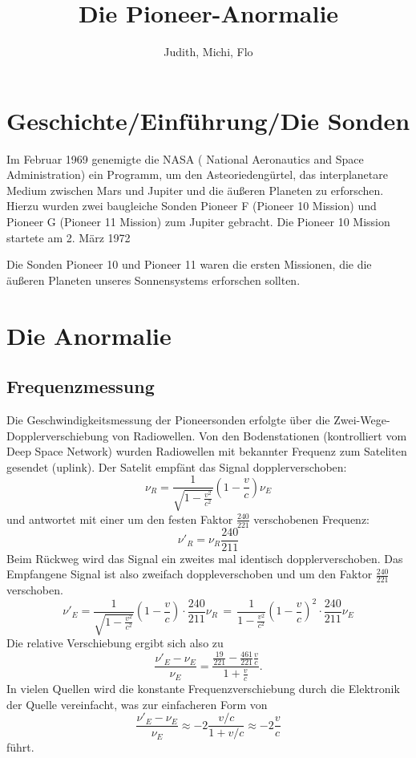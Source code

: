 \documentclass[a4paper,10pt]{article}
\title{Die Pioneer-Anormalie}
\author{Judith, Michi, Flo}
\begin{document}
\maketitle

% 

\section{Geschichte/Einführung/Die Sonden}
Im Februar 1969 genemigte die NASA ( National Aeronautics and Space Administration) ein Programm, um den Asteoriedengürtel,
das interplanetare Medium zwischen Mars und Jupiter und die äußeren Planeten zu erforschen.
Hierzu wurden zwei baugleiche Sonden Pioneer F (Pioneer 10 Mission) und Pioneer G (Pioneer 11 Mission) zum Jupiter gebracht.
Die Pioneer 10 Mission startete am 2. März 1972

Die Sonden Pioneer 10 und Pioneer 11 waren die ersten Missionen, die die äußeren Planeten unseres Sonnensystems erforschen sollten. 


\section{Die Anormalie}
\subsection{Frequenzmessung}

Die Geschwindigkeitsmessung der Pioneersonden erfolgte über die Zwei-Wege-Dopplerverschiebung von Radiowellen.
Von den Bodenstationen (kontrolliert vom Deep Space Network) wurden Radiowellen mit bekannter Frequenz zum Sateliten gesendet (uplink).
Der Satelit empfänt das Signal dopplerverschoben:
\begin{equation}
 \nu_R = \frac{1}{\sqrt{1-\frac{v^2}{c^2}}}(1-\frac{v}{c})\nu_E
\end{equation}
und antwortet mit einer um den festen Faktor $ \frac{240}{221} $ verschobenen Frequenz:
\begin{equation}
\nu'_R = \nu_R\frac{240}{211}
\end{equation}
Beim Rückweg wird das Signal ein zweites mal identisch dopplerverschoben. Das Empfangene Signal ist also zweifach doppleverschoben und um den Faktor $\frac{240}{221}$ verschoben.
\begin{equation}
 \nu'_E = \frac{1}{\sqrt{1-\frac{v^2}{c^2}}}(1-\frac{v}{c}) \cdot \frac{240}{211}\nu_R \, = \, \frac{1}{1-\frac{v^2}{c^2}}(1-\frac{v}{c})^2 \cdot \frac{240}{211} \nu_E
\end{equation}
Die relative Verschiebung ergibt sich also zu
\begin{equation}
 \frac{\nu'_E-\nu_E}{\nu_E} = \frac{\frac{19}{221}- \frac{461}{221}\frac{v}{c}}{1+\frac{v}{c}}.
\end{equation}
In vielen Quellen wird die konstante Frequenzverschiebung durch die Elektronik der Quelle vereinfacht, was zur einfacheren Form von
\begin{equation}
 \frac{\nu'_E-\nu_E}{\nu_E} \approx -2\frac{v/c}{1+v/c} \approx -2 \frac{v}{c}
\end{equation}
führt.
\end{document}
